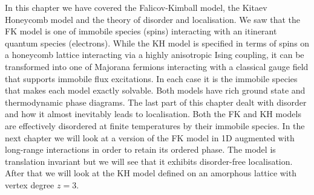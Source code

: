 In this chapter we have covered the Falicov-Kimball model, the Kitaev Honeycomb model and the theory of disorder and localisation. We saw that the FK model is one of immobile species (spins) interacting with an itinerant quantum species (electrons). While the KH model is specified in terms of spins on a honeycomb lattice interacting via a highly anisotropic Ising coupling, it can be transformed into one of Majorana fermions interacting with a classical gauge field that supports immobile flux excitations. In each case it is the immobile species that makes each model exactly solvable. Both models have rich ground state and thermodynamic phase diagrams. The last part of this chapter dealt with disorder and how it almost inevitably leads to localisation. Both the FK and KH models are effectively disordered at finite temperatures by their immobile species. In the next chapter we will look at a version of the FK model in 1D augmented with long-range interactions in order to retain its ordered phase. The model is translation invariant but we will see that it exhibits disorder-free localisation. After that we will look at the KH model defined on an amorphous lattice with vertex degree \(z=3\).
